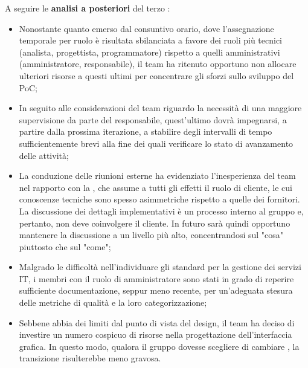 \vspace{0.5\baselineskip}
\par A seguire le \textbf{analisi a posteriori} del terzo :
\begin{itemize}
  \item Nonostante quanto emerso dal consuntivo orario, dove l'assegnazione temporale per ruolo è risultata sbilanciata a favore dei ruoli più tecnici (analista, progettista, programmatore) rispetto a quelli amministrativi (amministratore, responsabile), il team ha ritenuto opportuno non allocare ulteriori risorse a questi ultimi per concentrare gli sforzi sullo sviluppo del PoC;
  \item In seguito alle considerazioni del team riguardo la necessità di una maggiore supervisione da parte del responsabile, quest'ultimo dovrà impegnarsi, a partire dalla prossima iterazione, a stabilire degli intervalli di tempo sufficientemente brevi alla fine dei quali verificare lo stato di avanzamento delle attività;
  \item La conduzione delle riunioni esterne ha evidenziato l'inesperienza del team nel rapporto con la , che assume a tutti gli effetti il ruolo di cliente, le cui conoscenze tecniche sono spesso asimmetriche rispetto a quelle dei fornitori. La discussione dei dettagli implementativi è un processo interno al gruppo e, pertanto, non deve coinvolgere il cliente. In futuro sarà quindi opportuno mantenere la discussione a un livello più alto, concentrandosi sul "cosa" piuttosto che sul "come";
  \item Malgrado le difficoltà nell'individuare gli standard per la gestione dei servizi IT, i membri con il ruolo di amministratore sono stati in grado di reperire sufficiente documentazione, seppur meno recente, per un'adeguata stesura delle metriche di qualità e la loro categorizzazione;
  \item Sebbene  abbia dei limiti dal punto di vista del design, il team ha deciso di investire un numero cospicuo di risorse nella progettazione dell'interfaccia grafica. In questo modo, qualora il gruppo dovesse scegliere di cambiare , la transizione risulterebbe meno gravosa.
\end{itemize}

